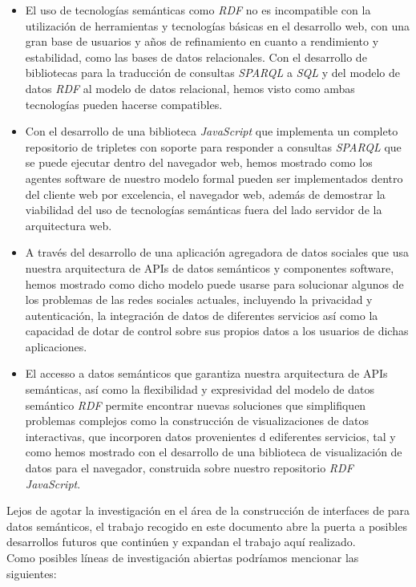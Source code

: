 \begin{itemize}
  \item El uso de tecnolog\'ias sem\'anticas como \textit{RDF} no es incompatible con la utilizaci\'on de herramientas y tecnolog\'ias b\'asicas en el desarrollo web, con una gran base de usuarios y a\~nos de refinamiento en cuanto a rendimiento y estabilidad, como las bases de datos relacionales. Con el desarrollo de bibliotecas para la traducci\'on de consultas \textit{SPARQL} a \textit{SQL} y del modelo de datos \textit{RDF} al modelo de datos relacional, hemos visto como ambas tecnolog\'ias pueden hacerse compatibles.
  \item Con el desarrollo de una biblioteca \textit{JavaScript} que implementa un completo repositorio de tripletes con soporte para responder a consultas \textit{SPARQL} que se puede ejecutar dentro del navegador web, hemos mostrado como los agentes software de nuestro modelo formal pueden ser implementados dentro del cliente web por excelencia, el navegador web, adem\'as de demostrar la viabilidad del uso de tecnolog\'ias sem\'anticas fuera del lado servidor de la arquitectura web.
  \item A trav\'es del desarrollo de una aplicaci\'on agregadora de datos sociales que usa nuestra arquitectura de APIs de datos sem\'anticos y componentes software, hemos mostrado como dicho modelo puede usarse para solucionar algunos de los problemas de las redes sociales actuales, incluyendo la privacidad y autenticaci\'on, la integraci\'on de datos de diferentes servicios as\'i como la capacidad de dotar de control sobre sus propios datos a los usuarios de dichas aplicaciones.
  \item El accesso a datos sem\'anticos que garantiza nuestra arquitectura de APIs sem\'anticas, as\'i como la flexibilidad y expresividad del modelo de datos sem\'antico \textit{RDF} permite encontrar nuevas soluciones que simplifiquen problemas complejos como la construcci\'on de visualizaciones de datos interactivas, que incorporen datos provenientes d ediferentes servicios, tal y como hemos mostrado con el desarrollo de una biblioteca de visualizaci\'on de datos para el navegador, construida sobre nuestro repositorio \textit{RDF} \textit{JavaScript}.
\end{itemize}

Lejos de agotar la investigaci\'on en el \'area de la construcci\'on de interfaces de para datos sem\'anticos, el trabajo recogido en este documento abre la puerta a posibles desarrollos futuros que contin\'uen y expandan el trabajo aqu\'i realizado.\\
Como posibles l\'ineas de investigaci\'on abiertas podr\'iamos mencionar las siguientes:

